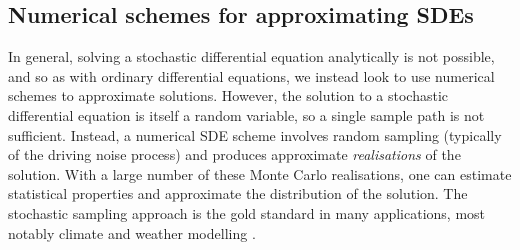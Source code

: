 



\subsection{Numerical schemes for approximating SDEs}\label{sec:numeric_sdes}
In general, solving a stochastic differential equation analytically is not possible, and so as with ordinary differential equations, we instead look to use numerical schemes to approximate solutions.
However, the solution to a stochastic differential equation is itself a random variable, so a single sample path is not sufficient.
Instead, a numerical SDE scheme involves random sampling (typically of the driving noise process) and produces approximate \emph{realisations} of the solution.
With a large number of these Monte Carlo realisations, one can estimate statistical properties and approximate the distribution of the solution.
The stochastic sampling approach is the gold standard in many applications, most notably climate and weather modelling \citep{Collins_2007_EnsemblesProbabilitiesNew}.

